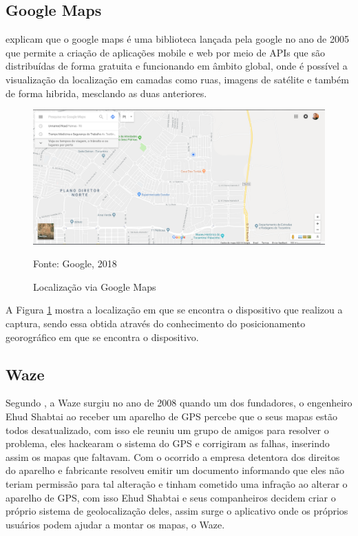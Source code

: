 	\subsection{Google Maps}
		 explicam que o google maps é uma biblioteca lançada pela google no ano de 2005 que permite a criação de aplicações mobile e web por meio de APIs que são distribuídas de forma gratuita e funcionando em âmbito global, onde é possível a visualização da localização em camadas como ruas, imagens de satélite e também de forma hibrida, mesclando as duas anteriores.
		\begin{figure}[H]
			\centering
			\includegraphics[scale=0.4]{imagens/gmaps}
			\caption{Localização via Google Maps}
			Fonte: Google, 2018
			\label{fig:gmaps}
		\end{figure}
		A Figura \ref{fig:gmaps} mostra a localização em que se encontra o dispositivo que realizou a captura, sendo essa  obtida através do conhecimento do posicionamento georográfico em que se encontra o dispositivo.
		
	\subsection{Waze}
	Segundo , a Waze surgiu no ano de 2008 quando um dos fundadores, o engenheiro Ehud Shabtai ao receber um aparelho de GPS percebe que o seus mapas estão todos desatualizado, com isso ele reuniu um grupo de amigos para resolver o problema, eles hackearam o sistema do GPS e corrigiram as falhas, inserindo assim os mapas que faltavam. Com o ocorrido a empresa detentora dos direitos do aparelho e fabricante resolveu emitir um documento informando que eles não teriam permissão para tal alteração e tinham cometido uma infração ao alterar o aparelho de GPS, com isso Ehud Shabtai e seus companheiros decidem criar o próprio sistema de geolocalização deles, assim surge o aplicativo onde os próprios usuários podem ajudar a montar os mapas, o Waze.
	
